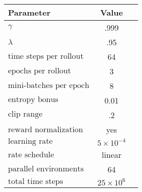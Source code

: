 \begin{tabular}{lcc}
    \toprule
    \textbf{Parameter} & \textbf{Value} \\
    \midrule
    \(\gamma\) & .999 \\
    \(\lambda\) & .95 \\
    \(\text{time steps per rollout}\) & 64 \\
    \(\text{epochs per rollout}\) & 3 \\
    \(\text{mini-batches per epoch}\) & 8 \\
    \(\text{entropy bonus}\) & 0.01 \\
    \(\text{clip range}\) & .2 \\
    \(\text{reward normalization}\) & yes \\
    \(\text{learning rate}\) & \(5 \times 10^{-4}\) \\
    \(\text{rate schedule}\) & linear \\
    \(\text{parallel environments}\) & 64 \\
    \(\text{total time steps}\) & \(25 \times 10^6\) \\
    \bottomrule
\end{tabular}